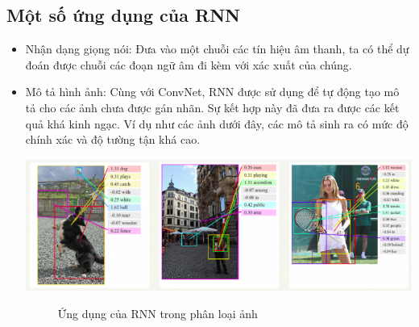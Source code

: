 \subsection{Một số ứng dụng của RNN}
\begin{itemize}
    \item Nhận dạng giọng nói: Đưa vào một chuỗi các tín hiệu âm thanh, ta có thể dự đoán được chuỗi các đoạn ngữ âm đi kèm với xác xuất của chúng.
    \item Mô tả hình ảnh: Cùng với ConvNet, RNN được sử dụng để tự động tạo mô tả cho các ảnh chưa được gán nhãn. Sự kết hợp này đã đưa ra được các kết quả khá kinh ngạc. Ví dụ như các ảnh dưới đây, các mô tả sinh ra có mức độ chính xác và độ tường tận khá cao.
    \begin{center}
    \includegraphics[scale=.4]{image/chapter6/RNN-application.png}
    \begin{figure}[htp]
    \begin{center}
     
    \end{center}
    \caption{Ứng dụng của RNN trong phân loại ảnh \cite{rnn-basic}}
    \end{figure}
    \end{center}
\end{itemize}


